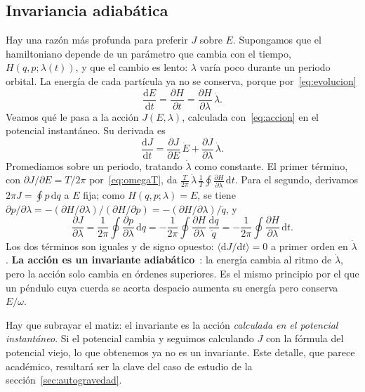 \documentclass[11pt,a4paper]{article}
\newcommand{\dd}{\mathrm{d}}
\newcommand{\Jr}{J}
\theoremstyle{definition}
\begin{document}
\subsection{Invariancia adiabática}
\label{sec:adiabatica}

Hay una razón más profunda para preferir $\Jr$ sobre $E$. Supongamos que el
hamiltoniano depende de un parámetro que cambia con el tiempo, $H(q,p;\lambda(t))$, y
que el cambio es lento: $\lambda$ varía poco durante un periodo orbital. La energía
de cada partícula ya no se conserva, porque por~\eqref{eq:evolucion}
\begin{equation}
  \frac{\dd E}{\dd t} = \frac{\partial H}{\partial t}
  = \frac{\partial H}{\partial\lambda}\,\dot\lambda .
\end{equation}
Veamos qué le pasa a la acción $\Jr(E,\lambda)$, calculada con~\eqref{eq:accion} en el
potencial instantáneo. Su derivada es
\begin{equation}
  \frac{\dd\Jr}{\dd t}
  = \frac{\partial\Jr}{\partial E}\,\dot E + \frac{\partial\Jr}{\partial\lambda}\,\dot\lambda .
\end{equation}
Promediamos sobre un periodo, tratando $\dot\lambda$ como constante. El primer
término, con $\partial\Jr/\partial E=T/2\pi$ por~\eqref{eq:omegaT}, da
$\frac{T}{2\pi}\,\dot\lambda\,\frac{1}{T}\oint\frac{\partial H}{\partial\lambda}\,\dd t$.
Para el segundo, derivamos $2\pi\Jr=\oint p\,\dd q$ a $E$ fija; como
$H(q,p;\lambda)=E$, se tiene $\partial p/\partial\lambda=-(\partial H/\partial\lambda)
/(\partial H/\partial p)=-(\partial H/\partial\lambda)/\dot q$, y
\begin{equation}
  \frac{\partial\Jr}{\partial\lambda}
  = \frac{1}{2\pi}\oint\frac{\partial p}{\partial\lambda}\,\dd q
  = -\frac{1}{2\pi}\oint\frac{\partial H}{\partial\lambda}\,\frac{\dd q}{\dot q}
  = -\frac{1}{2\pi}\oint\frac{\partial H}{\partial\lambda}\,\dd t .
\end{equation}
Los dos términos son iguales y de signo opuesto: $\langle\dd\Jr/\dd t\rangle=0$ a
primer orden en $\dot\lambda$. \textbf{La acción es un invariante
adiabático}~\cite[\S49]{landau1976}: la energía cambia al ritmo de $\dot\lambda$, pero
la acción solo cambia en órdenes superiores. Es el mismo principio por el que un
péndulo cuya cuerda se acorta despacio aumenta su energía pero conserva $E/\omega$.

Hay que subrayar el matiz: el invariante es la acción \emph{calculada en el
potencial instantáneo}. Si el potencial cambia y seguimos calculando $\Jr$ con la
fórmula del potencial viejo, lo que obtenemos ya no es un invariante. Este detalle,
que parece académico, resultará ser la clave del caso de estudio de la
sección~\ref{sec:autogravedad}.
\end{document}

